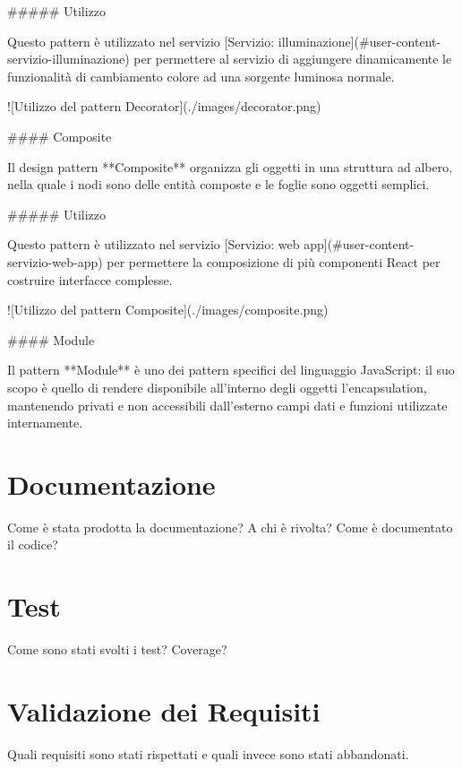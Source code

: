 ##### Utilizzo

Questo pattern è utilizzato nel servizio [Servizio: illuminazione](#user-content-servizio-illuminazione) per permettere al servizio di aggiungere dinamicamente le funzionalità di cambiamento colore ad una sorgente luminosa normale.

![Utilizzo del pattern Decorator](./images/decorator.png)

#### Composite

Il design pattern **Composite** organizza gli oggetti in una struttura ad albero, nella quale i nodi sono delle entità composte e le foglie sono oggetti semplici.

##### Utilizzo

Questo pattern è utilizzato nel servizio [Servizio: web app](#user-content-servizio-web-app) per permettere la composizione di più componenti React per costruire interfacce complesse.

![Utilizzo del pattern Composite](./images/composite.png)

#### Module

Il pattern **Module** è uno dei pattern specifici del linguaggio JavaScript: il suo scopo è quello di rendere disponibile all’interno degli oggetti l’encapsulation, mantenendo privati e non accessibili dall’esterno campi dati e funzioni utilizzate internamente.


\section{Documentazione}

Come è stata prodotta la documentazione? A chi è rivolta? Come è documentato il codice?

\section{Test}

Come sono stati svolti i test? Coverage?


\section{Validazione dei Requisiti}

Quali requisiti sono stati rispettati e quali invece sono stati abbandonati.
